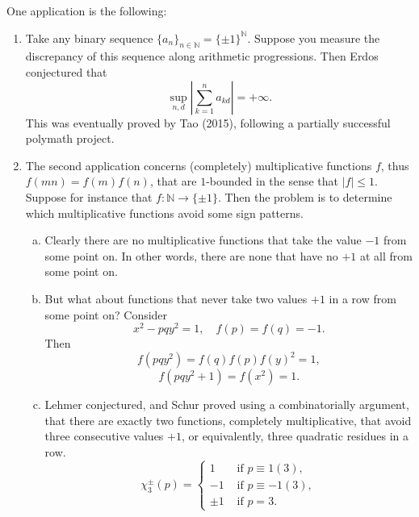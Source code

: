 \documentclass[reqno]{amsart} 
\begin{document}
One application is the following:
\begin{enumerate}
\item Take any binary sequence $\{a_n\}_{n \in \mathbb{N} } = \{\pm 1\}^{\mathbb{N} }$.  Suppose you measure the discrepancy of this sequence along arithmetic progressions.  Then Erdos conjectured that
  \begin{equation*}
    \sup_{n, d}
    \left\lvert
      \sum_{k = 1}^n a_{k d}
    \right\rvert
    =
    + \infty.
  \end{equation*}
  This was eventually proved by Tao (2015), following a partially successful polymath project.
\item The second application concerns (completely) multiplicative functions $f$, thus $f (m n) = f (m) f (n)$, that are $1$-bounded in the sense that $\lvert f \rvert \leq 1$.  Suppose for instance that $f : \mathbb{N} \rightarrow \{\pm 1\}$.  Then the problem is to determine which multiplicative functions avoid some sign patterns.
  \begin{enumerate}[(a)]
  \item Clearly there are no multiplicative functions that take the value $-1$ from some point on.  In other words, there are none that have no $+1$ at all from some point on.
  \item But what about functions that never take two values $+1$ in a row from some point on?  Consider
    \begin{equation*}
      x^2 - p q y^2 = 1, \quad f (p) = f (q ) = - 1.
    \end{equation*}
    Then
    \begin{equation*}
      f (p q y^2 ) = f (q ) f (p) f (y)^2 = 1,
    \end{equation*}
    \begin{equation*}
      f (p q y^2 + 1) = f (x^2 ) = 1.
    \end{equation*}
  \item Lehmer conjectured, and Schur proved using a combinatorially argument, that there are exactly two functions, completely multiplicative, that avoid three consecutive values $+1$, or equivalently, three quadratic residues in a row.
    \begin{equation*}
      \chi_3^{\pm} (p) =
      \begin{cases}
        1  &  \text{ if } p \equiv 1(3), \\
        -1 &  \text{ if } p \equiv -1(3), \\
        \pm 1 &  \text{ if } p = 3.
      \end{cases}

\end{equation*}
\end{enumerate}
\end{enumerate}
\end{document}
